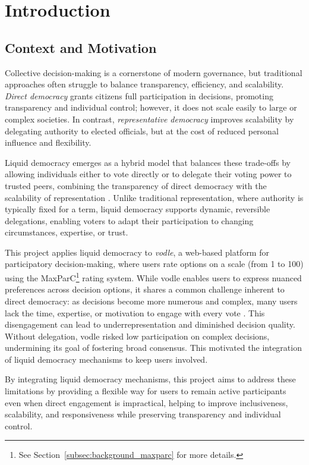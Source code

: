 \chapter{Introduction}\label{ch:introduction}

\section{Context and Motivation}

Collective decision-making is a cornerstone of modern governance, but traditional approaches often struggle to balance transparency, efficiency, and scalability. \textit{Direct democracy} grants citizens full participation in decisions, promoting transparency and individual control; however, it does not scale easily to large or complex societies. In contrast, \textit{representative democracy} improves scalability by delegating authority to elected officials, but at the cost of reduced personal influence and flexibility.

Liquid democracy emerges as a hybrid model that balances these trade-offs by allowing individuals either to vote directly or to delegate their voting power to trusted peers, combining the transparency of direct democracy with the scalability of representation \citep{ford_delegative_2002, blum_liquid_2016}. Unlike traditional representation, where authority is typically fixed for a term, liquid democracy supports dynamic, reversible delegations, enabling voters to adapt their participation to changing circumstances, expertise, or trust.

This project applies liquid democracy to \textit{vodle}, a web-based platform for participatory decision-making, where users rate options on a scale (from 1 to 100) using the MaxParC\footnote{See Section~\ref{subsec:background_maxparc} for more details.} rating system. While vodle enables users to express nuanced preferences across decision options, it shares a common challenge inherent to direct democracy: as decisions become more numerous and complex, many users lack the time, expertise, or motivation to engage with every vote \citep{ford_delegative_2002, blum_liquid_2016}. This disengagement can lead to underrepresentation and diminished decision quality. Without delegation, vodle risked low participation on complex decisions, undermining its goal of fostering broad consensus. This motivated the integration of liquid democracy mechanisms to keep users involved.

By integrating liquid democracy mechanisms, this project aims to address these limitations by providing a flexible way for users to remain active participants even when direct engagement is impractical, helping to improve inclusiveness, scalability, and responsiveness while preserving transparency and individual control.

